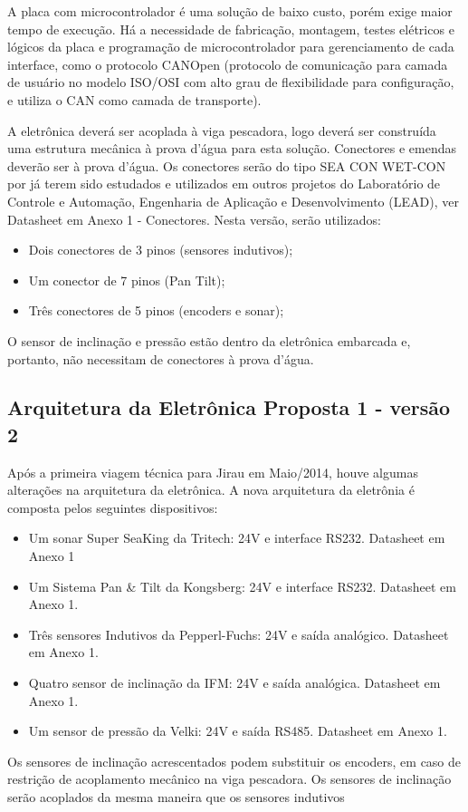 A placa com microcontrolador é uma solução de baixo custo, porém exige maior
tempo de execução. Há a necessidade de fabricação, montagem, testes elétricos e
lógicos da placa e programação de microcontrolador para gerenciamento de cada
interface, como o protocolo CANOpen (protocolo de comunicação para camada de
usuário no modelo ISO/OSI com alto grau de flexibilidade para configuração, e
utiliza o CAN como camada de transporte).

A eletrônica deverá ser acoplada à viga pescadora, logo deverá ser construída
uma estrutura mecânica à prova d’água para esta solução. Conectores e emendas
deverão ser à prova d'água. Os conectores serão do tipo SEA CON WET-CON por já
terem sido estudados e utilizados em outros projetos do Laboratório de Controle
e Automação, Engenharia de Aplicação e Desenvolvimento (LEAD), ver Datasheet em
Anexo 1 - Conectores. Nesta versão, serão utilizados:
\begin{itemize}
  \item Dois conectores de 3 pinos (sensores indutivos);
  \item Um conector de 7 pinos (Pan Tilt);
  \item Três conectores de 5 pinos (encoders e sonar);
\end{itemize}
O sensor de inclinação e pressão estão dentro da eletrônica embarcada e,
portanto, não necessitam de conectores à prova d'água.

\subsection{Arquitetura da Eletrônica Proposta 1 - versão 2}
Após a primeira viagem técnica para Jirau em Maio/2014, houve algumas alterações
na arquitetura da eletrônica. A nova arquitetura da eletrônia é composta pelos
seguintes dispositivos:
\begin{itemize}
  \item Um sonar Super SeaKing da Tritech: 24V e interface RS232. Data\-sheet em
  Anexo 1
  \item Um Sistema Pan \& Tilt da Kongsberg: 24V e interface RS232. Data\-sheet
  em Anexo 1.
  \item Três sensores Indutivos da Pepperl-Fuchs: 24V e saída ana\-lógico.
  Data\-sheet em Anexo 1.
  \item Quatro sensor de inclinação da IFM: 24V e saída analógica.
  Data\-sheet em Anexo 1.
  \item Um sensor de pressão da Velki: 24V e saída RS485. Datasheet em Anexo 1.
\end{itemize}
Os sensores de inclinação acrescentados podem substituir os encoders, em caso de
restrição de acoplamento mecânico na viga pescadora. 
Os sensores de inclinação serão acoplados da mesma
maneira que os sensores indutivos

